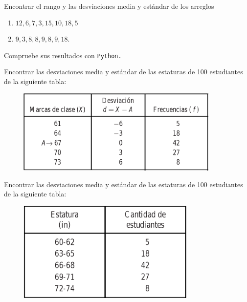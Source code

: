 \begin{problema}
	\label{problema:4.3}
	Encontrar el rango y las desviaciones media y estándar de los arreglos 
	\begin{enumerate}
		\item $12,6,7,3,15,10,18,5$ 
		\item $9,3,8,8,9,8,9,18.$
	\end{enumerate}
	
	Compruebe sus resultados con \texttt{Python.}
\end{problema}




\begin{problema}
	\label{problema:4.4}
	Encontrar las desviaciones media y estándar de las estaturas de 100 estudiantes de la siguiente tabla:
	\begin{figure}[ht]
		\centering
		\includegraphics[width=10cm,keepaspectratio=true]{./images/tab0302.png}
		\label{tab:0302}
	\end{figure}
	
\end{problema}




\begin{problema}
	\label{problema:4.11}
	Encontrar las desviaciones media y estándar de las estaturas de 100 estudiantes de la siguiente tabla:
	\begin{figure}[ht]
		\centering
		\includegraphics[height=5cm,keepaspectratio=true]{./images/tab0201.png}
		\label{tab:0201}
	\end{figure}
	
\end{problema}




